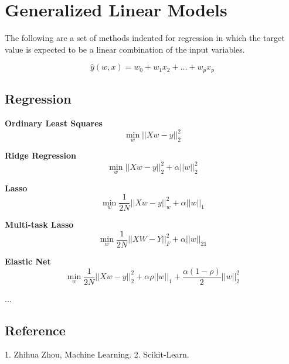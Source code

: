 \section{Generalized Linear Models}

The following are a set of methods indented for regression in which the target
value is expected to be a linear combination of the input variables.

$$ \hat{y}(w,x) = w_0 + w_1x_2 + \ldots + w_p x_p $$

\subsection{Regression}

{\bf Ordinary Least Squares}
$$ \min_w ||Xw-y||_2^2 $$

{\bf Ridge Regression}
$$ \min_w ||Xw-y||_2^2 + \alpha ||w||_2^2 $$

{\bf Lasso}
$$ \min_w \frac{1}{2N} ||Xw-y||_w^2 + \alpha ||w||_1 $$

{\bf Multi-task Lasso}
$$ \min_w \frac{1}{2N} ||XW-Y||_F^2 + \alpha ||w||_{21} $$

{\bf Elastic Net}
$$ \min_w \frac{1}{2N} ||Xw-y||_2^2 + \alpha\rho ||w||_1 + 
\frac{\alpha(1-\rho)}{2} ||w||_2^2 $$

...

\subsection{Reference}

1. Zhihua Zhou, Machine Learning.
2. Scikit-Learn.

